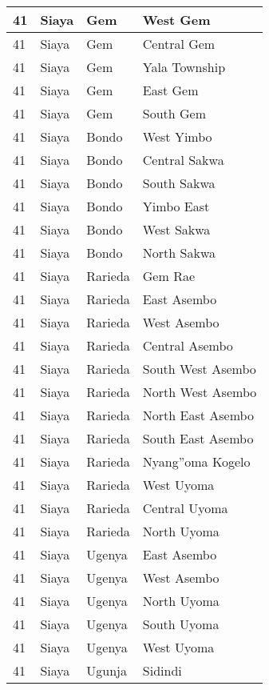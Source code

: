 \begin{table}[!ht]
\begin{tabular}{|l|l|l|l|}
        41 & Siaya & Gem & West Gem \\ \hline
        41 & Siaya & Gem & Central Gem \\ \hline
        41 & Siaya & Gem & Yala Township \\ \hline
        41 & Siaya & Gem & East Gem \\ \hline
        41 & Siaya & Gem & South Gem \\ \hline
        41 & Siaya & Bondo & West Yimbo \\ \hline
        41 & Siaya & Bondo & Central Sakwa \\ \hline
        41 & Siaya & Bondo & South Sakwa \\ \hline
        41 & Siaya & Bondo & Yimbo East \\ \hline
        41 & Siaya & Bondo & West Sakwa \\ \hline
        41 & Siaya & Bondo & North Sakwa \\ \hline
        41 & Siaya & Rarieda & Gem Rae \\ \hline
        41 & Siaya & Rarieda & East Asembo \\ \hline
        41 & Siaya & Rarieda & West Asembo \\ \hline
        41 & Siaya & Rarieda & Central Asembo \\ \hline
        41 & Siaya & Rarieda & South West Asembo \\ \hline
        41 & Siaya & Rarieda & North West Asembo \\ \hline
        41 & Siaya & Rarieda & North East Asembo \\ \hline
        41 & Siaya & Rarieda & South East Asembo \\ \hline
        41 & Siaya & Rarieda & Nyang''oma Kogelo \\ \hline
        41 & Siaya & Rarieda & West Uyoma \\ \hline
        41 & Siaya & Rarieda & Central Uyoma \\ \hline
        41 & Siaya & Rarieda & North Uyoma \\ \hline
        41 & Siaya & Ugenya & East Asembo \\ \hline
        41 & Siaya & Ugenya & West Asembo \\ \hline
        41 & Siaya & Ugenya & North Uyoma \\ \hline
        41 & Siaya & Ugenya & South Uyoma \\ \hline
        41 & Siaya & Ugenya & West Uyoma \\ \hline
        41 & Siaya & Ugunja & Sidindi \\ \hline

\end{tabular}
\end{table}
